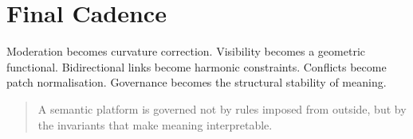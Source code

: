\section{Final Cadence}

Moderation becomes curvature correction.  
Visibility becomes a geometric functional.  
Bidirectional links become harmonic constraints.  
Conflicts become patch normalisation.  
Governance becomes the structural stability of meaning.

\begin{quote}
A semantic platform is governed not by rules imposed from outside,
but by the invariants that make meaning interpretable.
\end{quote}
